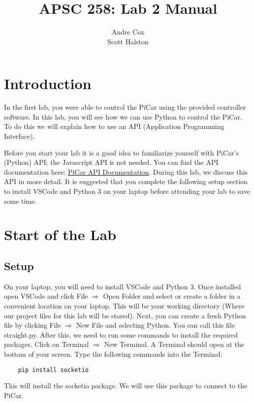 \documentclass[11pt]{report}
\title{APSC 258: Lab 2 Manual}
\author{Andre Cox \\ Scott Halston}
\begin{document}
\maketitle
\tableofcontents

\clearpage

\chapter{Introduction}
In the first lab, you were able to control the PiCar using the provided controller software. In this lab, you will see how we can use Python to control the PiCar. To do this we will explain how to use an API (Application Programming Interface).


Before you start your lab it is a good idea to familiarize yourself with PiCar's (Python) API; the Javascript API is not needed. You can find the API documentation here:
\href{https://github.com/PiCarV/Car-Software/wiki/Pi-Car-V-API-Documentation}{PiCar
    API Documentation}. During this lab, we discuss this API in more detail. It is suggested that you complete the following setup section to install VSCode and Python 3 on your laptop before attending your lab to save some time.

\chapter{Start of the Lab}
\section{Setup}
On your laptop, you will need to install VSCode and Python 3. Once installed open VSCode and click File $\Rightarrow$ Open Folder and select or create a folder in a convenient location on your laptop. This will be your working directory (Where our project files for this lab will be stored). Next, you can create a fresh Python file by clicking File $\Rightarrow$ New File and selecting Python. You can call this file straight.py. After this, we need to run some commands to install the required packages. Click on Terminal $\Rightarrow$ New Terminal. A Terminal should open at the bottom of your screen. Type the following commands into the Terminal:
\begin{verbatim}
    pip install socketio 
    \end{verbatim}
This will install the socketio package. We will use this package to connect to the PiCar.
\end{document}
